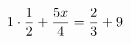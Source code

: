 \documentclass[preview]{standalone}
\begin{document}
\begin{align*}
\special{dvisvgm:raw <g id='unique000'>}1 \cdot \frac{1}{2} + \frac{5 x}{4} = \frac{2}{3} + 9\special{dvisvgm:raw </g>}
\end{align*}
\end{document}
